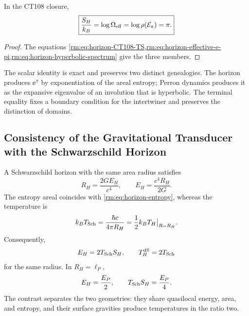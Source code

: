\begin{corollary}
\label{rm:cor:horizon-Perron-scalar}
In the CT108 closure,
\begin{equation}
 \boxed{
 \frac{S_H}{k_B}
 =\log\Omega_{\rm eff}
 =\log\rho(\mathcal E_\pi)
 =\pi.}
 \label{rm:eq:horizon-Perron-log}
\end{equation}
\end{corollary}

\begin{proof}
The equations
\cref{rm:eq:horizon-CT108-TS,rm:eq:horizon-effective-e-pi,rm:eq:horizon-hyperbolic-spectrum}
give the three members.
\end{proof}

The scalar identity is exact and preserves two distinct genealogies. The
horizon produces \(\ee^\pi\) by exponentiation of the areal entropy;
Perron dynamics produces it as the expansive eigenvalue of an
involution that is hyperbolic. The terminal equality fixes a boundary condition
for the intertwiner and preserves the distinction of domains.

\subsection{Consistency of the Gravitational Transducer with the Schwarzschild Horizon}

A Schwarzschild horizon with the same area radius satisfies
\begin{equation}
 R_H=\frac{2GE_H}{c^4},
 \qquad
 E_H=\frac{c^4R_H}{2G}.
 \label{rm:eq:horizon-Schwarzschild-energy}
\end{equation}
The entropy areal coincides with \cref{rm:eq:horizon-entropy}, whereas the
temperature is
\begin{equation}
 k_BT_{\rm Sch}=\frac{\hbar c}{4\pi R_H}
 =\frac12k_BT_H\big|_{R=R_H}.
 \label{rm:eq:horizon-Schwarzschild-temperature}
\end{equation}
Consequently,
\begin{equation}
 E_H=2T_{\rm Sch}S_H,
 \qquad
 T_H^{\rm dS}=2T_{\rm Sch}
 \label{rm:eq:horizon-Schwarzschild-Smarr}
\end{equation}
for the same radius. In \(R_H=\ell_P\),
\begin{equation}
 E_H=\frac{E_P}{2},
 \qquad
 T_{\rm Sch}S_H=\frac{E_P}{4}.
 \label{rm:eq:horizon-Schwarzschild-Planck}
\end{equation}
The contrast separates the two geometries: they share quasilocal energy,
area, and entropy, and their surface gravities produce temperatures
in the ratio two.

